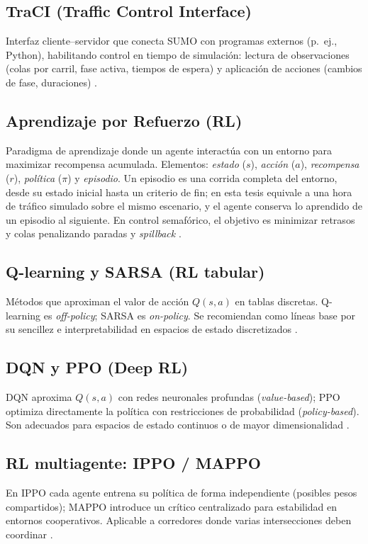 \subsection*{TraCI (Traffic Control Interface)}
Interfaz cliente–servidor que conecta SUMO con programas externos (p.~ej., Python), habilitando control en tiempo de simulación: lectura de observaciones (colas por carril, fase activa, tiempos de espera) y aplicación de acciones (cambios de fase, duraciones) \citep{TraCI_Docs,TraCI_Whitepaper}.

\subsection*{Aprendizaje por Refuerzo (RL)}
Paradigma de aprendizaje donde un agente interactúa con un entorno para maximizar recompensa acumulada. Elementos: \textit{estado} ($s$), \textit{acción} ($a$), \textit{recompensa} ($r$), \textit{política} ($\pi$) y \textit{episodio}. Un episodio es una corrida completa del entorno, desde su estado inicial hasta un criterio de fin; en esta tesis equivale a una hora de tráfico simulado sobre el mismo escenario, y el agente conserva lo aprendido de un episodio al siguiente. En control semafórico, el objetivo es minimizar retrasos y colas penalizando paradas y \textit{spillback} \citep{SuttonBarto2018}.

\subsection*{Q-learning y SARSA (RL tabular)}
Métodos que aproximan el valor de acción $Q(s,a)$ en tablas discretas. Q-learning es \textit{off-policy}; SARSA es \textit{on-policy}. Se recomiendan como líneas base por su sencillez e interpretabilidad en espacios de estado discretizados \citep{SuttonBarto2018}.

\subsection*{DQN y PPO (Deep RL)}
DQN aproxima $Q(s,a)$ con redes neuronales profundas (\textit{value-based}); PPO optimiza directamente la política con restricciones de probabilidad (\textit{policy-based}). Son adecuados para espacios de estado continuos o de mayor dimensionalidad \citep{Mnih2015_DQN,Schulman2017_PPO,SB3_Docs}.

\subsection*{RL multiagente: IPPO / MAPPO}
En IPPO cada agente entrena su política de forma independiente (posibles pesos compartidos); MAPPO introduce un crítico centralizado para estabilidad en entornos cooperativos. Aplicable a corredores donde varias intersecciones deben coordinar \citep{Yu2021_MAPPO}.

